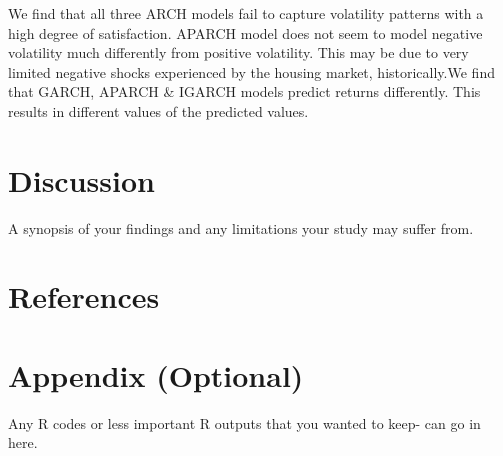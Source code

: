 \documentclass[
  man]{apa6}
\newlength{\cslhangindent}
\newenvironment{CSLReferences}[2] %
 {\begin{list}{}{%
  \setlength{\itemindent}{0pt}
  \setlength{\leftmargin}{0pt}
  \setlength{\parsep}{0pt}
  \ifodd #1
   \setlength{\leftmargin}{\cslhangindent}
   \setlength{\itemindent}{-1\cslhangindent}
  \fi
  \setlength{\itemsep}{#2\baselineskip}}}
 {\end{list}}
\begin{document}
We find that all three ARCH models fail to capture volatility patterns with a high degree of satisfaction. APARCH model does not seem to model negative volatility much differently from positive volatility. This may be due to very limited negative shocks experienced by the housing market, historically.We find that GARCH, APARCH \& IGARCH models predict returns differently. This results in different values of the predicted values.

\section{Discussion}\label{discussion}

A synopsis of your findings and any limitations your study may suffer from.

\newpage

\section{References}\label{references}

\label{refs}
\begin{CSLReferences}{0}{1}
\end{CSLReferences}

\section{Appendix (Optional)}\label{appendix-optional}

Any R codes or less important R outputs that you wanted to keep- can go in here.
\end{document}
